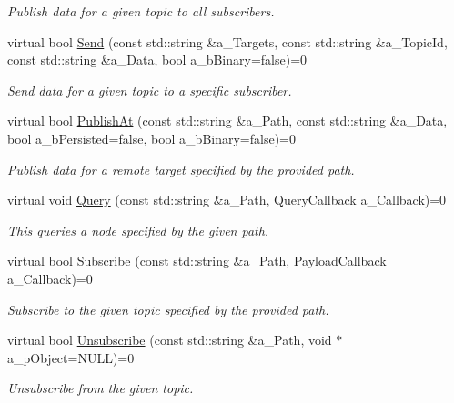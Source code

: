 \begin{DoxyCompactItemize}
\begin{DoxyCompactList}\small\item\em Publish data for a given topic to all subscribers. \end{DoxyCompactList}\item 
\mbox{\label{class_i_topics_aa880819fe848bca35084d00b79f89bb9}} 
virtual bool \hyperlink{class_i_topics_aa880819fe848bca35084d00b79f89bb9}{Send} (const std\+::string \&a\+\_\+\+Targets, const std\+::string \&a\+\_\+\+Topic\+Id, const std\+::string \&a\+\_\+\+Data, bool a\+\_\+b\+Binary=false)=0
\begin{DoxyCompactList}\small\item\em Send data for a given topic to a specific subscriber. \end{DoxyCompactList}\item 
\mbox{\label{class_i_topics_a569035e8547a27be7204b85d47ec0be1}} 
virtual bool \hyperlink{class_i_topics_a569035e8547a27be7204b85d47ec0be1}{Publish\+At} (const std\+::string \&a\+\_\+\+Path, const std\+::string \&a\+\_\+\+Data, bool a\+\_\+b\+Persisted=false, bool a\+\_\+b\+Binary=false)=0
\begin{DoxyCompactList}\small\item\em Publish data for a remote target specified by the provided path. \end{DoxyCompactList}\item 
virtual void \hyperlink{class_i_topics_a2d0193d6be4ce0c10d4bf352c21eb56a}{Query} (const std\+::string \&a\+\_\+\+Path, Query\+Callback a\+\_\+\+Callback)=0
\begin{DoxyCompactList}\small\item\em This queries a node specified by the given path. \end{DoxyCompactList}\item 
virtual bool \hyperlink{class_i_topics_a6381bbfcfc39b3630a802bae4c7c5337}{Subscribe} (const std\+::string \&a\+\_\+\+Path, Payload\+Callback a\+\_\+\+Callback)=0
\begin{DoxyCompactList}\small\item\em Subscribe to the given topic specified by the provided path. \end{DoxyCompactList}\item 
\mbox{\label{class_i_topics_a4043b6a356ae263276d43c915bbb20ab}} 
virtual bool \hyperlink{class_i_topics_a4043b6a356ae263276d43c915bbb20ab}{Unsubscribe} (const std\+::string \&a\+\_\+\+Path, void $\ast$a\+\_\+p\+Object=N\+U\+LL)=0
\begin{DoxyCompactList}\small\item\em Unsubscribe from the given topic. \end{DoxyCompactList}\end{DoxyCompactItemize}
